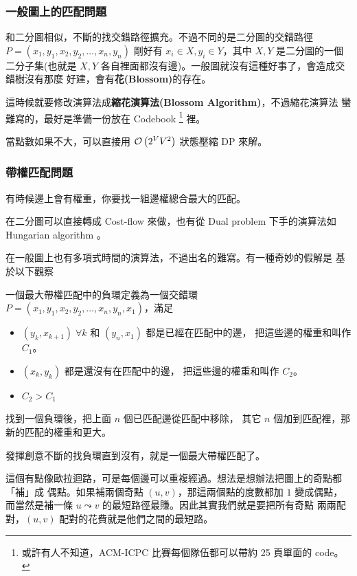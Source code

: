 \documentclass[a4paper,12pt]{book}
\begin{document}
\subsubsection{一般圖上的匹配問題}
和二分圖相似，不斷的找交錯路徑擴充。不過不同的是二分圖的交錯路徑 \\
$P = (x_1, y_1, x_2, y_2, \dots, x_n, y_n)$ 剛好有 
$x_i \in X, y_i \in Y$，其中 $X, Y$ 是二分圖的一個二分子集(也就是
$X, Y$ 各自裡面都沒有邊)。一般圖就沒有這種好事了，會造成交錯樹沒有那麼
好建，會有{\bf 花(Blossom)}的存在。

這時候就要修改演算法成{\bf 縮花演算法(Blossom Algorithm)}，不過縮花演算法
蠻難寫的，最好是準備一份放在 Codebook 
\footnote{或許有人不知道，ACM-ICPC 比賽每個隊伍都可以帶約 25 頁單面的 code。}
裡。

當點數如果不大，可以直接用 $\operatorname{\mathcal{O}}\left(2^V V^2\right)$ 狀態壓縮 DP 來解。

\subsubsection{帶權匹配問題}
有時候邊上會有權重，你要找一組邊權總合最大的匹配。

在二分圖可以直接轉成 Cost-flow 來做，也有從 Dual problem 下手的演算法如
Hungarian algorithm 。

在一般圖上也有多項式時間的演算法，不過出名的難寫。有一種奇妙的假解是
基於以下觀察
\begin{theorem}[定義]
  一個最大帶權匹配中的負環定義為一個交錯環\\
  $P = (x_1, y_1, x_2, y_2, \dots, x_n, y_n, x_1)$，滿足
  \begin{itemize}
    \item $(y_k, x_{k+1}) \; \forall k$ 和 $(y_n, x_1)$ 都是已經在匹配中的邊，
      把這些邊的權重和叫作 $C_1$。
    \item $(x_k, y_{k})$ 都是還沒有在匹配中的邊，
      把這些邊的權重和叫作 $C_2$。
    \item $C_2 > C_1$
  \end{itemize}
  找到一個負環後，把上面 $n$ 個已匹配邊從匹配中移除，
  其它 $n$ 個加到匹配裡，那新的匹配的權重和更大。
\end{theorem}
發揮創意不斷的找負環直到沒有，就是一個最大帶權匹配了。

這個有點像歐拉迴路，可是每個邊可以重複經過。想法是想辦法把圖上的奇點都「補」成
偶點。如果補兩個奇點 $(u, v)$，那這兩個點的度數都加 $1$ 變成偶點，
而當然是補一條 $u \leadsto v$ 的最短路徑最賺。因此其實我們就是要把所有奇點
兩兩配對，$(u, v)$ 配對的花費就是他們之間的最短路。 
\end{document}
